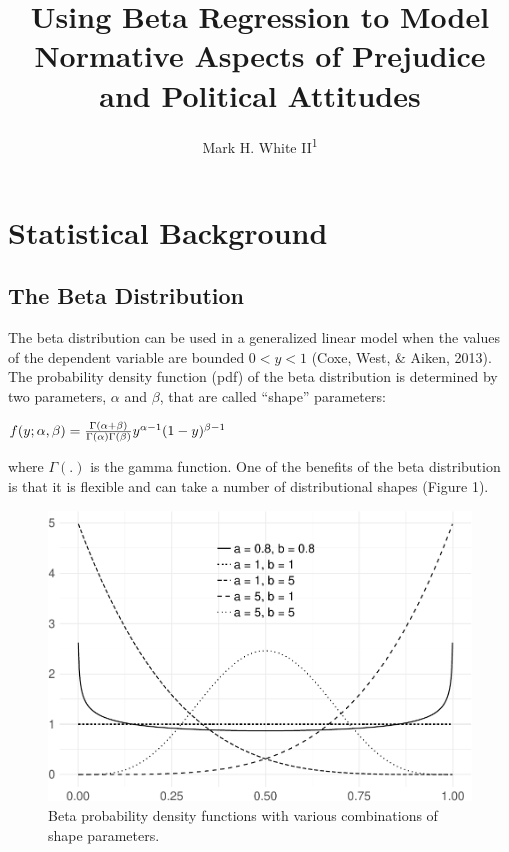 \documentclass[english,man]{apa6}
\title{Using Beta Regression to Model Normative Aspects of Prejudice and
Political Attitudes}
\author{Mark H. White II\textsuperscript{1}}
\affiliation{
    \vspace{0.5cm}
          \textsuperscript{1} University of Kansas  }
\theoremstyle{definition}
\theoremstyle{definition}
\theoremstyle{remark}
\begin{document}
\maketitle

\setcounter{secnumdepth}{0}



\section{Statistical Background}\label{statistical-background}

\subsection{The Beta Distribution}\label{the-beta-distribution}

The beta distribution can be used in a generalized linear model when the
values of the dependent variable are bounded \(0 < y < 1\) (Coxe, West,
\& Aiken, 2013). The probability density function (pdf) of the beta
distribution is determined by two parameters, \(\alpha\) and \(\beta\),
that are called \enquote{shape} parameters:

\begin{center}
$f(y;\alpha,\beta)={\Gamma(\alpha+\beta)\over\Gamma(\alpha)\Gamma(\beta)}y^{\alpha-1}(1-y)^{\beta-1}$
\end{center}

where \(\Gamma(.)\) is the gamma function. One of the benefits of the
beta distribution is that it is flexible and can take a number of
distributional shapes (Figure 1).

\begin{figure}
\centering
\includegraphics{beta_hurdle_files/figure-latex/unnamed-chunk-2-1.pdf}
\caption{\label{fig:unnamed-chunk-2}Beta probability density functions with
various combinations of shape parameters.}
\end{figure}
\end{document}
